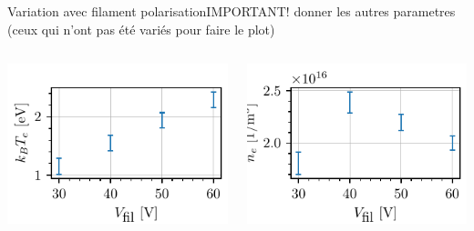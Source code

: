 \documentclass[10pt]{beamer}
\begin{document}
\begin{frame}{Variation avec filament polarisation}{IMPORTANT! donner les autres parametres (ceux qui n'ont pas été variés pour faire le plot)}
    \begin{columns}
        \centering
        \includegraphics[scale=1]{../figures/temperatureeV_filament_polarisation.pdf}


        \centering
        \includegraphics[scale=1]{../figures/density_filament_polarisation.pdf}

    \end{columns}
\end{frame}
\end{document}
